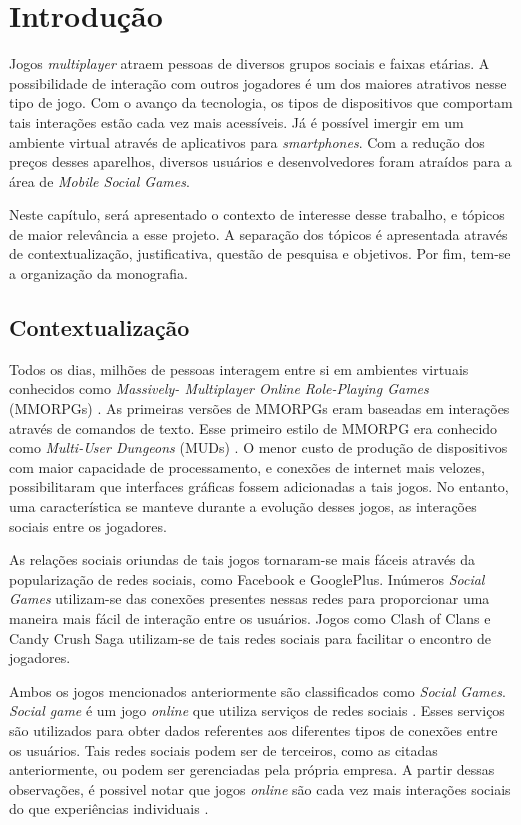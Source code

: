 \chapter[Introdução]{Introdução}

Jogos \textit{multiplayer} atraem pessoas de diversos grupos sociais e faixas etárias. A possibilidade de interação com outros jogadores
é um dos maiores atrativos nesse tipo de jogo. Com o avanço da tecnologia, os tipos de dispositivos que comportam tais interações
estão cada vez mais acessíveis. Já é possível imergir em um ambiente virtual através de aplicativos para \textit{smartphones}. Com a
redução dos preços desses aparelhos, diversos usuários e desenvolvedores foram atraídos para a área de \textit{Mobile Social Games}.

Neste capítulo, será apresentado o contexto de interesse desse trabalho, e
tópicos de maior relevância a esse projeto. A separação dos tópicos é
apresentada através de contextualização, justificativa, questão de pesquisa e
objetivos. Por fim, tem-se a organização da monografia.


\section{Contextualização}

Todos os dias, milhões de pessoas interagem entre si em ambientes virtuais
conhecidos como
\textit{Massively- Multiplayer Online Role-Playing Games}
(MMORPGs) \cite{nick2006}. As primeiras versões de MMORPGs eram baseadas em
interações através de comandos de texto. Esse primeiro estilo de MMORPG era
conhecido como \textit{Multi-User Dungeons} (MUDs) \cite{edward1997}.
O menor custo de produção de dispositivos com maior capacidade de
processamento, e conexões de internet mais velozes,
possibilitaram que interfaces gráficas fossem adicionadas a tais jogos. No
entanto, uma característica se manteve durante a evolução desses jogos,
as interações sociais entre os jogadores.

As relações sociais oriundas de tais jogos tornaram-se mais fáceis através da popularização de redes sociais, como Facebook e GooglePlus.
Inúmeros \textit{Social Games} utilizam-se das conexões presentes nessas redes para proporcionar uma maneira mais fácil de interação entre
os usuários. Jogos como Clash of Clans \cite{clashOfClans} e Candy Crush Saga\cite{candyCrush} utilizam-se de tais redes sociais para facilitar
o encontro de jogadores.

Ambos os jogos mencionados anteriormente são classificados como \textit{Social Games}. \textit{Social game} é um jogo \textit{online} que utiliza servi\c{c}os de redes sociais \cite{park2012}.
Esses serviços são utilizados para obter dados referentes aos diferentes tipos de conexões entre os usuários. Tais redes sociais podem ser de terceiros,
como as citadas anteriormente, ou podem ser gerenciadas pela própria empresa. A partir dessas observações, é possivel notar que
jogos \textit{online} são cada vez mais interações sociais do que experi\^encias individuais \cite{king2003}.


